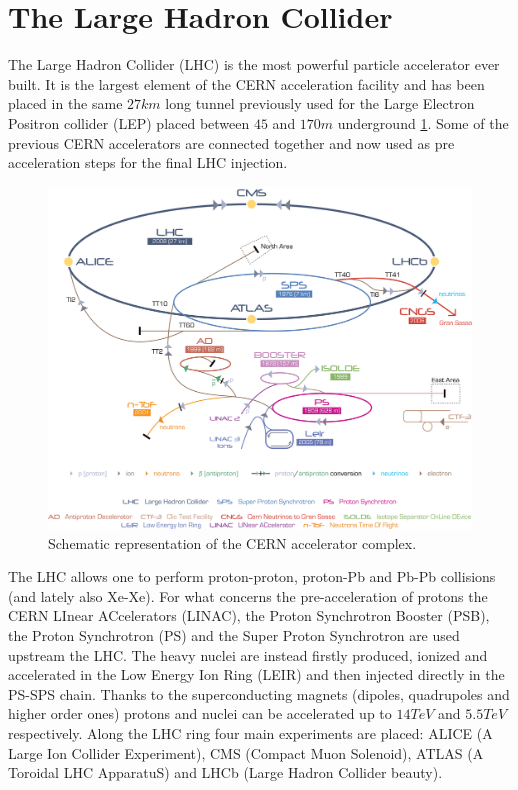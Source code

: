 \section{The Large Hadron Collider}
The Large Hadron Collider (LHC) is the most powerful particle accelerator ever built.
It is the largest element of the CERN acceleration facility and has been placed in the same $27km$ long tunnel previously used for the Large Electron Positron collider (LEP) placed between $45$ and $170m$ underground \ref{fig:accelerators}.
Some of the previous CERN accelerators are connected together and now used as pre acceleration steps for the final LHC injection.

\begin{figure}[!t]
\begin{center}
\includegraphics[width=\linewidth]{Chapters/Introduction/Figs/Cern-Accelerator-Complex.jpg}
\caption{Schematic representation of the CERN accelerator complex.}
\label{fig:accelerators}
\end{center}
\end{figure}

The LHC allows one to perform proton-proton, proton-Pb and Pb-Pb collisions (and lately also Xe-Xe).
For what concerns the pre-acceleration of protons the CERN LInear ACcelerators (LINAC), the Proton Synchrotron Booster (PSB), the Proton Synchrotron (PS) and the Super Proton Synchrotron are used upstream the LHC.
The heavy nuclei are instead firstly produced, ionized and accelerated in the Low Energy Ion Ring (LEIR) and then injected directly in the PS-SPS chain.
Thanks to the superconducting magnets (dipoles, quadrupoles and higher order ones) protons and nuclei can be accelerated up to $14TeV$ and $5.5TeV$ respectively.
Along the LHC ring four main experiments are placed: ALICE (A Large Ion Collider Experiment), CMS (Compact Muon Solenoid), ATLAS (A Toroidal LHC ApparatuS) and LHCb (Large Hadron Collider beauty).

